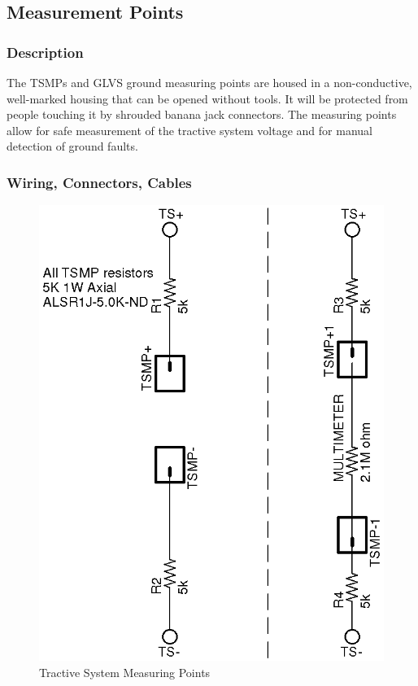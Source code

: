 \documentclass{article}
\begin{document}
    \subsection{Measurement Points}

        \subsubsection{Description}


            The TSMPs and GLVS ground measuring points are housed in a non-conductive, well-marked housing that can be opened without tools. It will be protected from people touching it by shrouded banana jack connectors. The measuring points allow for safe measurement of the tractive system voltage and for manual detection of ground faults.

        \subsubsection{Wiring, Connectors, Cables}

            \begin{figure}[H]
                \centering
                \includegraphics{TSMP}
                \caption{Tractive System Measuring Points}
                \label{fig:TSMPschematic}
            \end{figure}
\end{document}
